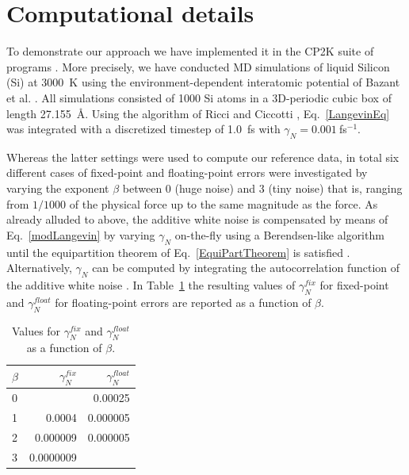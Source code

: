 \documentclass[format=acmsmall,authorversion,nonacm,timestamp,urlbreakonhyphens]{acmart}
\begin{document}
\section{Computational details}
\label{sec:computational}
To demonstrate our approach we have implemented it in the CP2K suite of programs \cite{cp2k}. More precisely, we have conducted MD simulations of liquid Silicon (Si) at 3000~K using the environment-dependent interatomic potential of Bazant et al. \cite{EIP1,EIP2}.
All simulations consisted of 1000 Si atoms in a 3D-periodic cubic box of length 27.155~\AA. Using the algorithm of Ricci and Ciccotti \cite{Ricci}, Eq.~\ref{LangevinEq} was integrated with a discretized timestep of 1.0~fs with $\gamma_N = 0.001~$fs$^{-1}$.

Whereas the latter settings were used to compute our reference data, in total six different cases of fixed-point and floating-point errors were investigated by varying the exponent $\beta$ between 0 (huge noise) and 3 (tiny noise) that is, ranging from $1/1000$ of the physical force up to the same magnitude as the force.
As already alluded to above, the additive white noise is compensated by means of Eq.~\ref{modLangevin} by varying $\gamma_N$ on-the-fly using a Berendsen-like algorithm until the equipartition theorem of Eq.~\ref{EquiPartTheorem} is satisfied \cite{Berendsen,TDKwater,TDKrev}. Alternatively, $\gamma_N$ can be computed by integrating the autocorrelation function of the additive white noise \cite{RZK}.
In Table~\ref{tab:gamma} the resulting values of \textit{\(\gamma_N^{fix}\)} for fixed-point and \textit{\(\gamma_N^{float}\)} for floating-point errors are reported as a function of \textit{\(\beta\)}.
\begin{table}
  \caption{Values for \textit{\(\gamma_N^{fix}\)} and \textit{\(\gamma_N^{float}\)} as a function of \textit{\(\beta\)}.}
  \label{tab:gamma}
  \begin{tabular}{lrr}
    \textit{\(\beta\)} & \textit{\(\gamma_N^{fix}\)} & \textit{\(\gamma_N^{float}\)} \\
    \hline
    0 &           & 0.00025  \\
    1 & 0.0004    & 0.000005 \\
    2 & 0.000009  & 0.000005 \\
    3 & 0.0000009 &
  \end{tabular}
\end{table}
\end{document}

